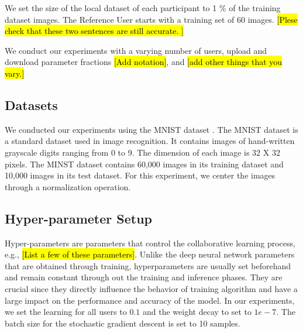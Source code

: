 \documentclass[conference]{IEEEtran}
\begin{document}
We set the size of the local dataset of each participant to 1 \% of the training dataset images. 
The Reference User starts with a training set of 60 images. \hl{[Plese check that these two sentences are still accurate. ]}

We conduct our experiments with a varying number of users, upload and download parameter fractions \hl{[Add notation]}, and \hl{[add
other things that you vary.]}




\subsection{Datasets}
We conducted our experiments using the MNIST dataset \cite{deng2012mnist}. The MNIST dataset is a standard dataset used in image
recognition. It contains images of hand-written grayscale digits ranging from 0 to 9. The dimension of each image is 32 X 32 pixels.
The MINST dataset contains 60,000 images in its training dataset and 10,000 images in its test dataset.
For this experiment, we center the images through a normalization operation.  

\subsection{Hyper-parameter Setup}

Hyper-parameters are parameters that control the collaborative learning process, e.g., \hl{[List a few of these parameters]}. Unlike
the deep neural network parameters that are obtained through training, hyperparameters are usually set beforehand and remain
constant through out the training and inference phases. They are crucial since they directly influence the behavior of training
algorithm and have a large impact on the performance and accuracy of the model. In our experiments, we set the learning for all
users to $0.1$ and the weight decay to set to $1e-7$. 
The batch size for the stochastic gradient descent is set to 10 samples.
\end{document}
